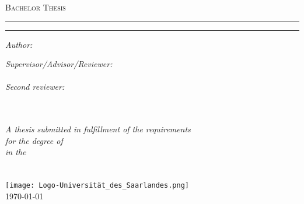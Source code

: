 \documentclass[
12pt, %
english, %
onehalfspacing, %
toctotoc, %
nohyperref, %
headsepline, %
chapterinoneline, %
]{MastersDoctoralThesis} %
\author{Daniel Gusenburger} %
\begin{document}
\frontmatter %

\pagestyle{plain} %


\begin{titlepage}
    \begin{center}
        {\scshape\LARGE \univname\par}\vspace{1cm} %
        \textsc{\Large Bachelor Thesis}\\[0.5cm] %
        \hrule
        \vspace{0.5cm}
        {\huge \bfseries \ttitle\par}
        \vspace{0.5cm} %
        \hrule
        \vspace{1.5cm}

        \begin{minipage}[t]{0.4\textwidth}
            \begin{flushleft} \large
                \emph{Author:}\\
                \authorname
            \end{flushleft}
        \end{minipage}
        \begin{minipage}[t]{0.5\textwidth}
            \begin{flushright} \large
                \emph{Supervisor/Advisor/Reviewer:} \\
                \supname\\[0.3cm]
                \emph{Second reviewer:}\\
                \examname\\
            \end{flushright}
        \end{minipage}\\[1cm]
        \large \textit{A thesis submitted in fulfillment of the requirements\\ for the degree of \degreename}\\[0.3cm] %
        \textit{in the}\\[0.3cm]
        \groupname\\\deptname\\[1cm] %
        \texttt{[image: Logo-Universität\_des\_Saarlandes.png]} \\[1cm]
        \vfill
        {\large \today}
    \end{center}
\end{titlepage}
\end{document}
